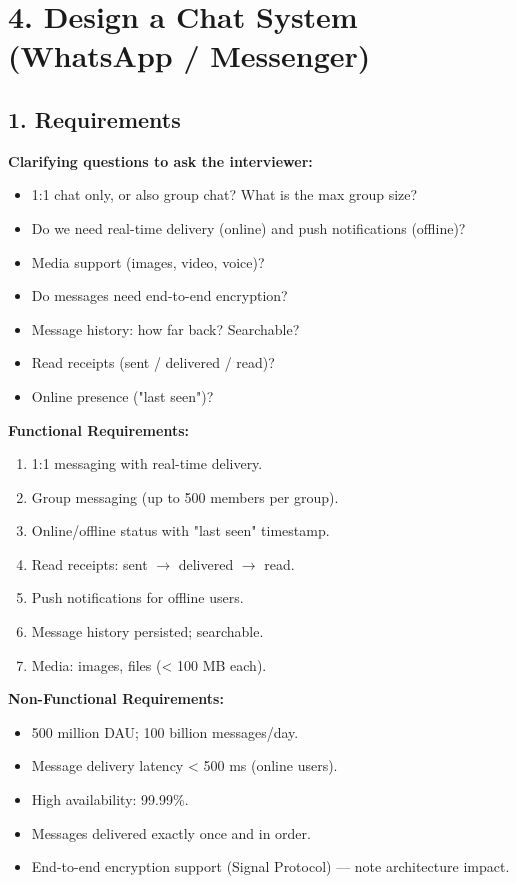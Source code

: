 \documentclass[11pt]{article}
\providecommand{\tightlist}{\setlength{\itemsep}{1pt}\setlength{\parskip}{0pt}}
\begin{document}
\section{4. Design a Chat System (WhatsApp / Messenger)}\label{4-design-a-chat-system-whatsapp--messenger}

\subsection{1. Requirements}\label{1-requirements-3}

\textbf{Clarifying questions to ask the interviewer:}

\begin{itemize}
\tightlist
\item
  1:1 chat only, or also group chat? What is the max group size?
\item
  Do we need real-time delivery (online) and push notifications (offline)?
\item
  Media support (images, video, voice)?
\item
  Do messages need end-to-end encryption?
\item
  Message history: how far back? Searchable?
\item
  Read receipts (sent / delivered / read)?
\item
  Online presence ("last seen")?
\end{itemize}

\textbf{Functional Requirements:}

\begin{enumerate}
\def\labelenumi{\arabic{enumi}.}
\tightlist
\item
  1:1 messaging with real-time delivery.
\item
  Group messaging (up to 500 members per group).
\item
  Online/offline status with "last seen" timestamp.
\item
  Read receipts: sent \(\rightarrow\) delivered \(\rightarrow\) read.
\item
  Push notifications for offline users.
\item
  Message history persisted; searchable.
\item
  Media: images, files (\textless{} 100 MB each).
\end{enumerate}

\textbf{Non-Functional Requirements:}

\begin{itemize}
\tightlist
\item
  500 million DAU; 100 billion messages/day.
\item
  Message delivery latency \textless{} 500 ms (online users).
\item
  High availability: 99.99\%.
\item
  Messages delivered exactly once and in order.
\item
  End-to-end encryption support (Signal Protocol) --- note architecture impact.
\end{itemize}
\end{document}
